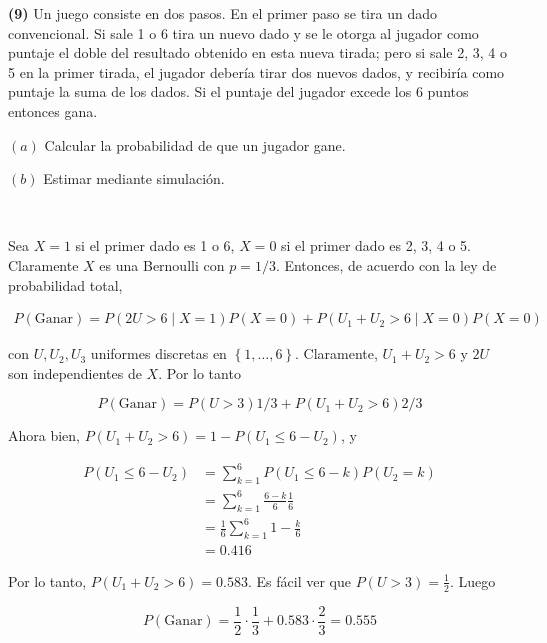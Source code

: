 \documentclass[a4paper, 12pt]{article}
\begin{document}
\pagebreak 

\begin{myframe}
\textbf{(9)} Un juego consiste en dos pasos. En el primer paso se tira un dado
convencional. Si sale 1 o 6 tira un nuevo dado y se le otorga al jugador como
puntaje el doble del resultado obtenido en esta nueva tirada; pero si sale 2, 3,
4 o 5 en la primer tirada, el jugador debería tirar dos nuevos dados, y
recibiría como puntaje la suma de los dados. Si el puntaje del jugador excede
los 6 puntos entonces gana.

$(a)$ Calcular la probabilidad de que un jugador gane.  

$(b)$ Estimar mediante simulación.
\end{myframe}

~ 


Sea $X = 1$ si el primer dado es 1 o 6, $X = 0$ si el primer dado es 2, 3, 4 o
5. Claramente $X$ es una Bernoulli con $p = 1 / 3$. Entonces, de acuerdo con la
ley de probabilidad total,

\begin{align*}
  P(\text{Ganar}) = P(2U > 6 \mid X = 1 )P(X = 0) + P(U_1 + U_2 > 6 \mid X = 0
  )P(X = 0 )
\end{align*}

con $U, U_2, U_3$ uniformes discretas en $\left\{ 1,\ldots,6 \right\} $.
Claramente, $U_1 + U_2 > 6$ y $2U$ son independientes de $X$. Por lo tanto 

\begin{equation*}
  P(\text{Ganar}) = P(U > 3) 1 / 3 + P(U_1 + U_2 > 6) 2 / 3
\end{equation*}

Ahora bien, $P(U_1 + U_2 > 6) = 1 - P(U_1 \leq 6 - U_2)$, y

\begin{align*}
  P(U_1 \leq 6 - U_2) 
  &= \sum_{k=1}^6 P(U_1 \leq 6 - k)P(U_2 = k) \\ 
  &=\sum_{k=1}^6 \frac{6-k}{6}\frac{1}{6} \\ 
  &=\frac{1}{6}\sum_{k=1}^6 1 - \frac{k}{6} \\ 
  &=0.416
\end{align*}

Por lo tanto, $P(U_1 + U_2 > 6) = 0.583$. Es fácil ver que $P(U > 3) =
\frac{1}{2}$. Luego 

\begin{equation*}
  P(\text{Ganar}) = \frac{1}{2} \cdot \frac{1}{3} + 0.583 \cdot \frac{2}{3} =
  0.555
\end{equation*}
\end{document}
